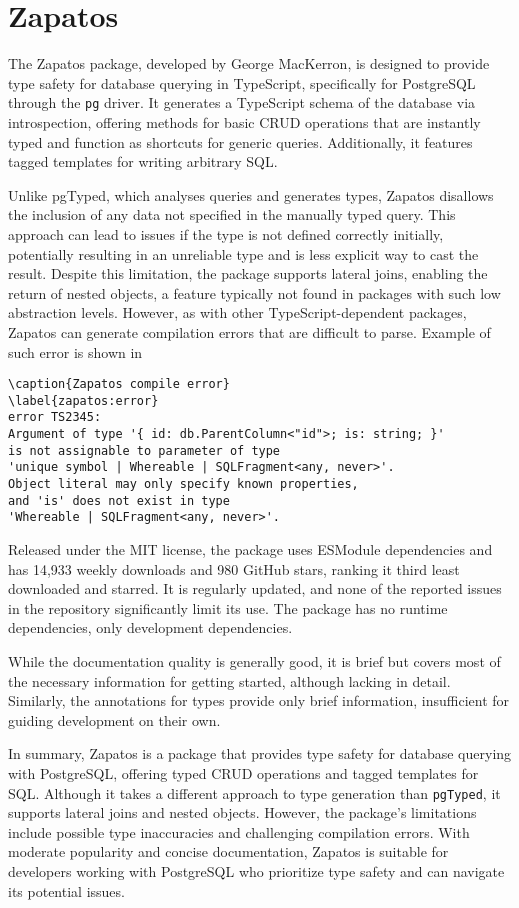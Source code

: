 \section{Zapatos}
The Zapatos package, developed by George MacKerron, is designed to provide type
safety for database querying in TypeScript, specifically for PostgreSQL through
the \texttt{pg} driver. It generates a TypeScript schema of the database via
introspection, offering methods for basic CRUD operations that are instantly
typed and function as shortcuts for generic queries. Additionally, it features
tagged templates for writing arbitrary SQL.

Unlike pgTyped, which analyses queries and generates types, Zapatos disallows
the inclusion of any data not specified in the manually typed query. This
approach can lead to issues if the type is not defined correctly initially,
potentially resulting in an unreliable type and is less explicit way to cast the
result. Despite this limitation, the package supports lateral joins, enabling
the return of nested objects, a feature typically not found in packages with
such low abstraction levels. However, as with other TypeScript-dependent
packages, Zapatos can generate compilation errors that are difficult to parse. Example of such error is shown in 

\begin{verbatim}
\caption{Zapatos compile error}
\label{zapatos:error}
error TS2345: 
Argument of type '{ id: db.ParentColumn<"id">; is: string; }' 
is not assignable to parameter of type 
'unique symbol | Whereable | SQLFragment<any, never>'.
Object literal may only specify known properties, 
and 'is' does not exist in type 
'Whereable | SQLFragment<any, never>'.
\end{verbatim}

Released under the MIT license, the package uses ESModule dependencies and has
14,933 weekly downloads and 980 GitHub stars, ranking it third least downloaded
and starred. It is regularly updated, and none of the reported issues in the
repository significantly limit its use. The package has no runtime dependencies,
only development dependencies.

While the documentation quality is generally good, it is brief but covers most
of the necessary information for getting started, although lacking in detail.
Similarly, the annotations for types provide only brief information,
insufficient for guiding development on their own.

In summary, Zapatos is a package that provides type safety for database querying
with PostgreSQL, offering typed CRUD operations and tagged templates for SQL.
Although it takes a different approach to type generation than \texttt{pgTyped},
it supports lateral joins and nested objects. However, the package's limitations
include possible type inaccuracies and challenging compilation errors. With
moderate popularity and concise documentation, Zapatos is suitable for
developers working with PostgreSQL who prioritize type safety and can navigate
its potential issues.

